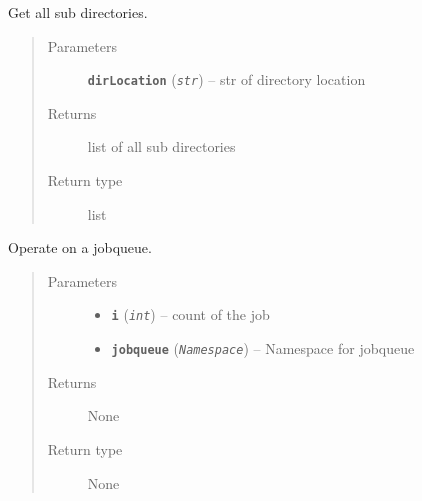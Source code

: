 \documentclass[letterpaper,10pt,english]{sphinxmanual}
\begin{document}

\begin{fulllineitems}
\label{iCallSV:iCallSV.iCallSV_dmp_wrapper.getSubDirs}
Get all sub directories.
\begin{quote}\begin{description}
\item[{Parameters}] \leavevmode
\textbf{\texttt{dirLocation}} (\emph{\texttt{str}}) -- str of directory location

\item[{Returns}] \leavevmode
list of all sub directories

\item[{Return type}] \leavevmode
list

\end{description}\end{quote}

\end{fulllineitems}


\begin{fulllineitems}
\label{iCallSV:iCallSV.iCallSV_dmp_wrapper.main}
\end{fulllineitems}


\begin{fulllineitems}
\label{iCallSV:iCallSV.iCallSV_dmp_wrapper.processor}
Operate on a jobqueue.
\begin{quote}\begin{description}
\item[{Parameters}] \leavevmode\begin{itemize}
\item {} 
\textbf{\texttt{i}} (\emph{\texttt{int}}) -- count of the job

\item {} 
\textbf{\texttt{jobqueue}} (\emph{\texttt{Namespace}}) -- Namespace for jobqueue

\end{itemize}

\item[{Returns}] \leavevmode
None

\item[{Return type}] \leavevmode
None

\end{description}\end{quote}

\end{fulllineitems}
\end{document}

